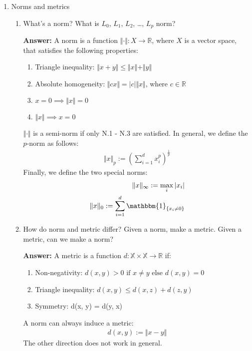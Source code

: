 \documentclass{article}
\newenvironment{QandA}{\begin{enumerate}[label=\arabic*.]}{\end{enumerate}}
\newenvironment{InnerQandA}{\begin{enumerate}[label=\roman*.]}{\end{enumerate}}
\newenvironment{answer}{\par\normalfont \textbf{Answer:}}{}
\newcommand{\R}{\mathbb{R}}
\begin{document}
\begin{QandA}
    \item Norms and metrics
    \begin{InnerQandA}
        \item What's a norm? What is $L_0$, $L_1$, $L_2$, \ldots, $L_p$ norm?
        \begin{answer}
            A norm is a function $\Vert \cdot \Vert: X \rightarrow \R$, where $X$ is a vector space, that satisfies the following properties:
            \begin{enumerate}[label={N.\arabic*.}]
                \item Triangle inequality: $\Vert x + y \Vert \le \Vert x \Vert + \Vert y \Vert$
                \item Absolute homogeneity: $\Vert cx \Vert = \vert c \vert \Vert x \Vert $, where $c \in \R$
                \item $x = 0 \implies \Vert x \Vert = 0 $ 
                \item $\Vert x \Vert \implies x = 0$
            \end{enumerate}
            $\Vert \cdot \Vert$ is a semi-norm if only N.1 - N.3 are satisfied. In general, we define the $p$-norm as follows:
            \begin{align*}
                \Vert x \Vert_p := \left( \sum_{i=1}^d x_i^p \right)^{\frac{1}{p}}
            \end{align*}
            Finally, we define the two special norms:
            \begin{align*}
                \Vert x \Vert_\infty := \max_{i} \vert x_i \vert \\
                \Vert x \Vert_0 := \sum_{i=1}^d \mathbbm{1}_{\{ x_i \neq 0 \}}
            \end{align*}
        \end{answer}

        \item How do norm and metric differ? Given a norm, make a metric. Given a metric, can we make a norm?
        \begin{answer}
            A metric is a function $d: \mathbb{X} \times \mathbb{X} \rightarrow \R$ if: 
            \begin{enumerate}[label={M.\arabic*.}]
                \item Non-negativity: $d(x, y) > 0 \text{ if } x \neq y \text{ else } d(x,y) = 0$ 
                \item Triangle inequality: $d(x, y) \le d(x, z) + d(z, y)$
                \item Symmetry: d(x, y) = d(y, x)
            \end{enumerate}
            A norm can always induce a metric: 
            \begin{align*}
                d(x, y) := \Vert x - y \Vert 
            \end{align*}
            The other direction does not work in general.
        \end{answer}
    \end{InnerQandA}
    
\end{QandA}
\end{document}
